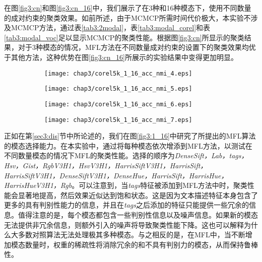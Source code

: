 在图\ref{fig3:cn}和图\ref{fig3:cn_16}中，我们展示了在3种和16种模态下，使用不同数量的成对约束的聚类效果。如前所述，由于MCMCP所需时间代价极大，本实验不涉及MCMCP方法，通过表\ref{tab3:2modal}，表\ref{tab3:modal_corel}和表\ref{tab3:modal_voc}足以显示MCMCP的聚类性能。根据图\ref{fig3:cn}所显示的聚类结果，对于3种模态的情况，MFL方法在不同数量成对约束的设置下的聚类效果均优于其他方法，这种优势在图\ref{fig3:cn_16}所展示的实验结果中变得更加明显。


\begin{figure}[t]
	\centering
	\begin{subfigure}{0.49\textwidth}
		\centering
		\texttt{[image: chap3/corel5k\_1\_16\_acc\_nmi\_4.eps]}
		\caption{}
		\label{fig3:1_16_acc_nmi_4}
	\end{subfigure}
	\begin{subfigure}{0.49\textwidth}
		\centering
		\texttt{[image: chap3/corel5k\_1\_16\_acc\_nmi\_5.eps]}
		\caption{}
		\label{fig3:1_16_acc_nmi_5}
    \end{subfigure}
    
	\centering
	\begin{subfigure}{0.49\textwidth}
		\centering
		\texttt{[image: chap3/corel5k\_1\_16\_acc\_nmi\_6.eps]}
		\caption{}
		\label{fig3:1_16_acc_nmi_6}
	\end{subfigure}
	\begin{subfigure}{0.49\textwidth}
		\centering
		\texttt{[image: chap3/corel5k\_1\_16\_acc\_nmi\_7.eps]}
		\caption{}
		\label{fig3:1_16_acc_nmi_7}
	\end{subfigure}
    \label{fig3:1_16_more}
\end{figure}

正如在第\ref{sec3:dis}节中所论述的，我们在图\ref{fig3:1_16}中研究了所提出的MFL算法的模态选择能力。在本实验中，通过将每种模态依次增添到MFL方法，以测试在不同数量模态的情况下MFL的聚类性能。选择的顺序为\textit{DenseSift，Lab，tags，Hsv，Gist，RgbV3H1，HsvV3H1，HarrisSiftV3H1，HarrisSift，HarrisSiftV3H1，DenseSiftV3H1，DenseHue，HarrisSift，HarrisHue，HarrisHueV3H1，Rgb}。可以注意到，当\textit{tags}特征被添加到MFL方法中时，聚类性能会显著地提高，然后效果近似达到饱和状态。这是因为文本描述特征本身包含了更多的具有判别性能力的信息，并且在\textit{tags}之后添加的特征只能提供一些冗余的信息。值得注意的是，每个模态都包含一些判别性信息以及噪声信息。如果新的模态无法提供非冗余信息，则额外引入的噪声将导致聚类性能下降。这也可以解释为什么大多数对照算法无法处理极其多种模态。与之相反的是，在MFL中，当不断增加模态数量时，权重的稀疏性将消除冗余的和不具有判别力的模态，从而保持鲁棒性。

